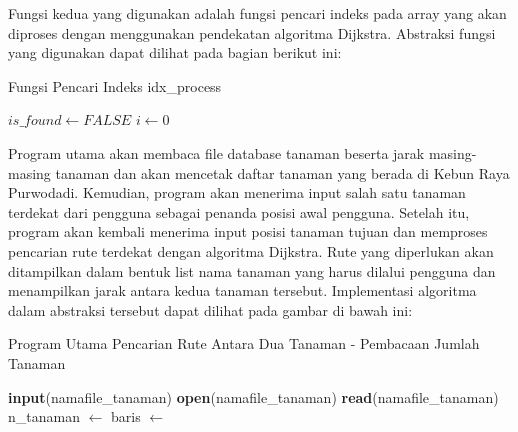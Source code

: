 \documentclass [conference] {IEEEtran}
\begin{document}
Fungsi kedua yang digunakan adalah fungsi pencari indeks pada array yang akan diproses dengan menggunakan pendekatan algoritma Dijkstra. Abstraksi fungsi yang digunakan dapat dilihat pada bagian berikut ini:
\begin{algorithm}
\caption{Fungsi Pencari Indeks {\selectfont idx\_process}}\label{alg:two}
\KwInit{}
$is\_found \gets FALSE$\;
$i \gets 0$\;
\KwAlgo{}
  {
}
\end{algorithm}
Program utama akan membaca file database tanaman beserta jarak masing-masing tanaman dan akan mencetak daftar tanaman yang berada di Kebun Raya Purwodadi. Kemudian, program akan menerima input salah satu tanaman terdekat dari pengguna sebagai penanda posisi awal pengguna. Setelah itu, program akan kembali menerima input posisi tanaman tujuan dan memproses pencarian rute terdekat dengan algoritma Dijkstra. Rute yang diperlukan akan ditampilkan dalam bentuk list nama tanaman yang harus dilalui pengguna dan menampilkan jarak antara kedua tanaman tersebut. Implementasi algoritma dalam abstraksi tersebut dapat dilihat pada gambar di bawah ini:
\begin{algorithm}
\caption{Program Utama Pencarian Rute Antara Dua Tanaman - Pembacaan Jumlah Tanaman}\label{alg:two}
\KwAlgo{}
\textbf{input}({\selectfont namafile\_tanaman})\;
\textbf{open}({\selectfont namafile\_tanaman})\;
\textbf{read}({\selectfont namafile\_tanaman})\;
{\selectfont n\_tanaman} $\gets$ {}\;
{\selectfont baris} $\gets$ {}\;
\end{algorithm}
\end{document}
